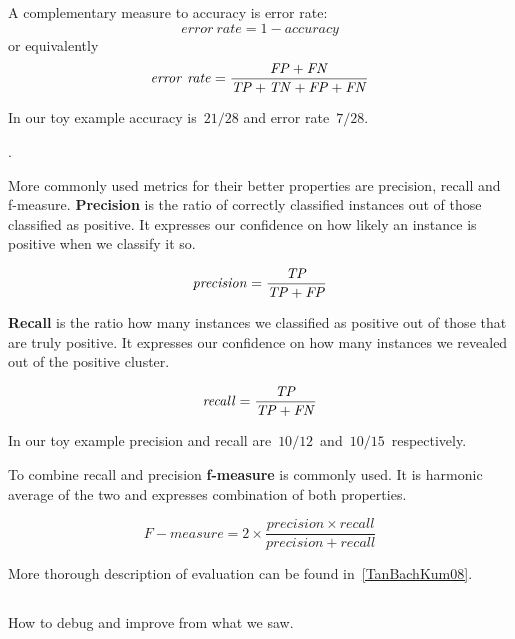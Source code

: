 A complementary measure to accuracy is error rate:
\begin{equation}
\mathit{error~rate} = 1 - \mathit{accuracy}
\end{equation}
or equivalently
\begin{equation}
\mathit{error~rate} = \frac{\mathit{FP} + \mathit{FN}}{\mathit{TP} + \mathit{TN} + \mathit{FP} + \mathit{FN}}
\end{equation}

In our toy example accuracy is~$21/28$ and error rate~$7/28$.

.

More commonly used metrics for their better properties are precision, recall and f-measure.
{\bf Precision} is the ratio of correctly classified instances out of those classified as positive.
It expresses our confidence on how likely an instance is positive when we classify it so.

\begin{equation}
\mathit{precision} = \frac{\mathit{TP}}{\mathit{TP} + \mathit{FP}}
\end{equation}

{\bf Recall} is the ratio how many instances we classified as positive out of those that are truly positive.
It expresses our confidence on how many instances we revealed out of the positive cluster.

\begin{equation}
\mathit{recall} = \frac{\mathit{TP}}{\mathit{TP} + \mathit{FN}}
\end{equation}

In our toy example precision and recall are~$10/12$~and~$10/15$~respectively.

To combine recall and precision {\bf f-measure} is commonly used.
It is harmonic average of the two and expresses combination of both properties.

\begin{equation}
	\mathit{F-measure} = 2 \times \frac{\mathit{precision}\times \mathit{recall}}{\mathit{precision} + \mathit{recall}}
\end{equation}


More thorough description of evaluation can be found in~\ref{TanBachKum08}.



\subsection{}

\subsection{}

How to debug and improve from what we saw.

\subsection{}
